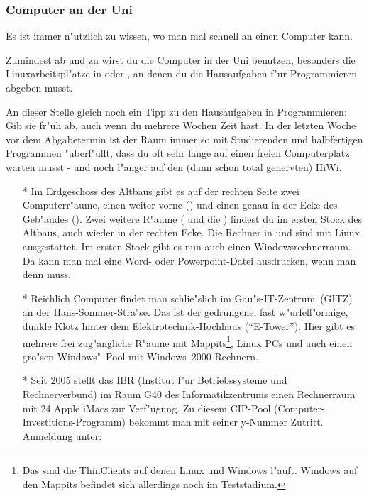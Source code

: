 \subsubsection{Computer an der Uni}
Es ist immer n"utzlich zu wissen, wo man mal schnell an einen Computer kann.

Zumindest ab und zu wirst du die Computer in der Uni benutzen, besonders
die Linuxarbeitspl"atze in  oder , an denen du die Hausaufgaben f"ur
Programmieren abgeben musst.

{\small
An dieser Stelle gleich noch ein Tipp zu den Hausaufgaben in Programmieren:
Gib sie fr"uh ab, auch wenn du mehrere Wochen Zeit hast. In der letzten Woche
vor dem Abgabetermin ist der Raum immer so mit Studierenden und halbfertigen
Programmen "uberf"ullt, dass du oft sehr lange auf einen freien Computerplatz
warten musst - und noch l"anger auf den (dann schon total genervten) HiWi.
}

\begin{itemize}

\item[*] Im Erdgeschoss des Altbaus gibt es auf der rechten Seite zwei
Computerr"aume, einen weiter vorne () und einen genau in der Ecke
des Geb"audes (). Zwei weitere R"aume ( und die
) findest du im ersten Stock des Altbaus, auch wieder in
der rechten Ecke. Die Rechner in  und  sind mit Linux
ausgestattet. Im ersten Stock gibt es nun auch einen Windowsrechnerraum. Da kann man mal eine Word- oder
Powerpoint-Datei ausdrucken, wenn man denn muss.

\item[*] Reichlich Computer findet man schlie"slich im Gau"s-IT-Zentrum~(GITZ) an der
Hans-Sommer-Stra"se. Das ist der gedrungene, fast w"urfelf"ormige, dunkle
Klotz hinter dem Elektrotechnik-Hochhaus ("`E-Tower"'). Hier gibt es mehrere frei
zug"angliche R"aume mit Mappits\footnote{Das sind die ThinClients auf denen
Linux und Windows l"auft. Windows auf den Mappits befindet sich allerdings noch
im Teststadium.}, Linux PCs und auch einen gro"sen Windows"~Pool mit
Windows~2000 Rechnern.

\item[*] Seit 2005 stellt das IBR (Institut f"ur Betriebssysteme und Rechnerverbund) im Raum G40 des Informatikzentrums einen Rechnerraum mit 24 Apple iMacs zur Verf"ugung. Zu diesem CIP-Pool (Computer-Investitions-Programm) bekommt man mit seiner y-Nummer Zutritt. Anmeldung unter: 

\end{itemize}

